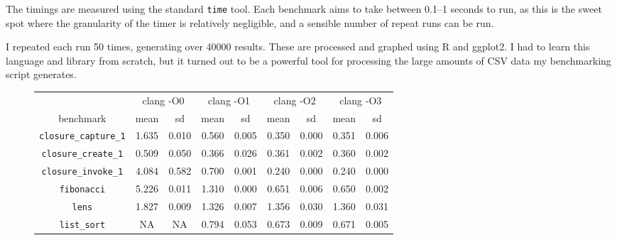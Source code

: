\documentclass[12pt,a4paper,twoside,openright]{report}
\begin{document}
The timings are measured using the standard \lstinline!time! tool. Each
benchmark aims to take between 0.1--1 seconds to run, as this is the sweet spot
where the granularity of the timer is relatively negligible, and a sensible
number of repeat runs can be run.

I repeated each run 50 times, generating over 40000 results. These are
processed and graphed using R and ggplot2. I had to learn this language and
library from scratch, but it turned out to be a powerful tool for processing
the large amounts of CSV data my benchmarking script generates.

\begin{figure}[h]
  \centering
  \small
\begin{tabular}{| c | c c | c c | c c | c c |}
  \hline
  & \multicolumn{2}{c|}{clang -O0}
  & \multicolumn{2}{c|}{clang -O1}
  & \multicolumn{2}{c|}{clang -O2}
  & \multicolumn{2}{c|}{clang -O3}
  \\
benchmark                     & mean  & sd    & mean  & sd    & mean  & sd    & mean  & sd \\
  \hline
\lstinline!closure_capture_1! & \cellcolor[hsb]{0.3,0.097,1}1.635 & 0.010 & \cellcolor[hsb]{0.3,0.691,1}0.560 & 0.005 & \cellcolor[hsb]{0.3,0.807,1}0.350 & 0.000 & \cellcolor[hsb]{0.3,0.806,1}0.351 & 0.006 \\
\lstinline!closure_create_1!  & \cellcolor[hsb]{0.0,1.000,1}0.509 & 0.050 & \cellcolor[hsb]{0.0,0.642,1}0.366 & 0.026 & \cellcolor[hsb]{0.0,0.626,1}0.361 & 0.002 & \cellcolor[hsb]{0.0,0.625,1}0.360 & 0.002 \\
\lstinline!closure_invoke_1!  & \cellcolor[hsb]{0.0,0.432,1}4.084 & 0.582 & \cellcolor[hsb]{0.3,0.680,1}0.700 & 0.001 & \cellcolor[hsb]{0.3,0.890,1}0.240 & 0.000 & \cellcolor[hsb]{0.3,0.890,1}0.240 & 0.000 \\
\lstinline!fibonacci!         & \cellcolor[hsb]{0.0,0.326,1}5.226 & 0.011 & \cellcolor[hsb]{0.3,0.586,1}1.310 & 0.000 & \cellcolor[hsb]{0.3,0.794,1}0.651 & 0.006 & \cellcolor[hsb]{0.3,0.794,1}0.650 & 0.002 \\
\lstinline!lens!              & \cellcolor[hsb]{0.0,1.000,1}1.827 & 0.009 & \cellcolor[hsb]{0.0,1.000,1}1.326 & 0.007 & \cellcolor[hsb]{0.0,1.000,1}1.356 & 0.030 & \cellcolor[hsb]{0.0,1.000,1}1.360 & 0.031 \\
\lstinline!list_sort!         &                                NA &    NA & \cellcolor[hsb]{0.3,0.292,1}0.794 & 0.053 & \cellcolor[hsb]{0.3,0.400,1}0.673 & 0.009 & \cellcolor[hsb]{0.0,0.402,1}0.671 & 0.005 \\

\end{tabular}
\end{figure}
\end{document}

